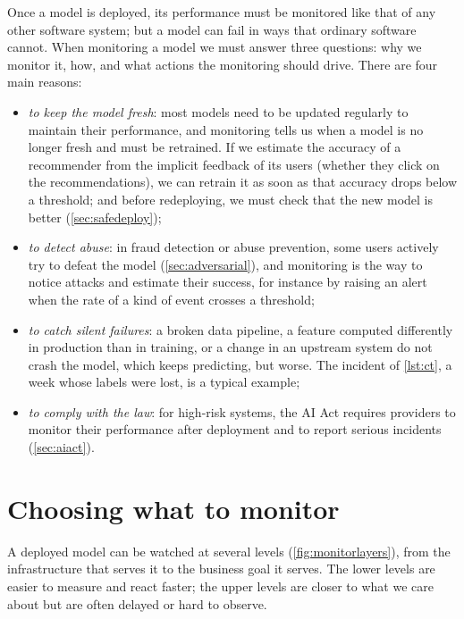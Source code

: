 Once a model is deployed, its performance must be monitored like that of any other software system;
but a model can fail in ways that ordinary software cannot. When monitoring a model we must answer three
questions: why we monitor it, how, and what actions the monitoring should drive. There are four main
reasons:
\begin{itemize}
  \item \emph{to keep the model fresh}: most models need to be updated regularly to maintain their
        performance, and monitoring tells us when a model is no longer fresh and must be retrained. If we
        estimate the accuracy of a recommender from the implicit feedback of its users (whether they
        click on the recommendations), we can retrain it as soon as that accuracy drops below a threshold;
        and before redeploying, we must check that the new model is better (\cref{sec:safedeploy});
  \item \emph{to detect abuse}: in fraud detection or abuse prevention, some users actively try to defeat
        the model (\cref{sec:adversarial}), and monitoring is the way to notice attacks and estimate their
        success, for instance by raising an alert when the rate of a kind of event crosses a threshold;
  \item \emph{to catch silent failures}: a broken data pipeline, a feature computed differently in
        production than in training, or a change in an upstream system do not crash the model, which keeps predicting, but worse. The incident of \cref{lst:ct}, a week whose labels were lost, is a typical
        example;
  \item \emph{to comply with the law}: for high-risk systems, the AI Act requires providers to monitor their
        performance after deployment and to report serious incidents (\cref{sec:aiact}).
\end{itemize}

\section{Choosing what to monitor}\label{sec:whatmonitor}

A deployed model can be watched at several levels (\cref{fig:monitorlayers}), from the infrastructure
that serves it to the business goal it serves. The lower levels are easier to measure and react faster;
the upper levels are closer to what we care about but are often delayed or hard to observe.

